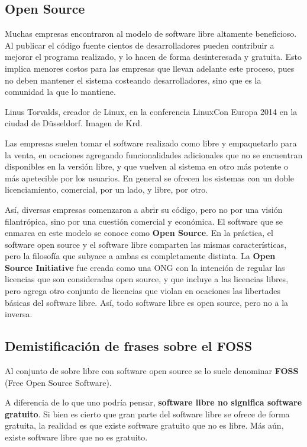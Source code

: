 \subsection{Open Source}

Muchas empresas encontraron al modelo de software libre altamente beneficioso.
Al publicar el código fuente cientos de desarrolladores pueden contribuir a
mejorar el programa realizado, y lo hacen de forma desinteresada y gratuita.
Esto implica menores costos para las empresas que llevan adelante este proceso,
pues no deben mantener el sistema costeando desarrolladores, sino que es la
comunidad la que lo mantiene.

{Linus Torvalds, creador de Linux, en la conferencia LinuxCon Europa 2014 en la
ciudad de Düsseldorf.}
{Imagen de Krd.}

Las empresas suelen tomar el software realizado como libre y empaquetarlo para
la venta, en ocaciones agregando funcionalidades adicionales que no se encuentran
disponibles en la versión libre, y que vuelven al sistema en otro más potente o
más apetecible por los usuarios. En general se ofrecen los sistemas con un
doble licenciamiento, comercial, por un lado, y libre, por otro.

Así, diversas empresas comenzaron a abrir su código, pero no por una visión
filantrópica, sino por una cuestión comercial y económica. El software que
se enmarca en este modelo se conoce como \textbf{Open Source}. En la práctica,
el software open source y el software libre comparten las mismas
características, pero la filosofía que subyace a ambas es completamente distinta.
La \textbf{Open Source Initiative} fue creada como una ONG con la intención de
regular las licencias que son consideradas open source, y que incluye a las
licencias libres, pero agrega otro conjunto de licencias que violan en ocaciones
las libertades básicas del software libre. Así, todo software libre es open source,
pero no a la inversa.

\subsection{Demistificación de frases sobre el FOSS}

Al conjunto de sobre libre con software open source se lo suele denominar
\textbf{FOSS} (Free Open Source Software).

A diferencia de lo que uno podría pensar, \textbf{software libre no significa
software gratuito}. Si bien es cierto que gran parte del software libre se ofrece
de forma gratuita, la realidad es que existe software gratuito que no es libre.
Más aún, existe software libre que no es gratuito.

